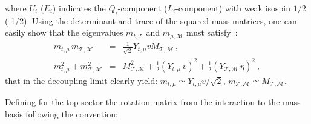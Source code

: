 where $U_{i}$ ($E_{i}$) indicates the $Q_{i}$-component ($L_{i}$-component) with weak isospin $1/2$ (-1/2). Using the determinant and trace of the squared mass matrices, one can easily show that the eigenvalues $m_{t,\mathcal{T}}$ and $m_{\mu,\mathcal{M}}$ must satisfy~\cite{Kamenik:2017tnu}:
\begin{eqnarray}
	\label{eq:Mass_Eigenvalues}
	m_{t,\mu} \,  m_{\mathcal{T,M}} & = & \frac{1}{\sqrt{2}} Y_{t,\mu} v M_{\mathcal{T,M}} \ , \\ m_{t,\mu}^2 + m_{\mathcal{T,M}}^2 & = & 
	M_{\mathcal{T,M}}^2 + \frac{1}{2} (Y_{t,\mu} \, v)^2 + \frac{1}{2} (Y_{\mathcal{T,M}} \, \eta)^2 \ , \nonumber
\end{eqnarray}
that in the decoupling limit clearly yield: $m_{t,\mu} \simeq Y_{t,\mu} v / \sqrt{2}$, $m_{\mathcal{T,M}} \simeq M_{\mathcal{T,M}}$.

Defining for the top sector the rotation matrix from the interaction to the mass basis following the convention:

